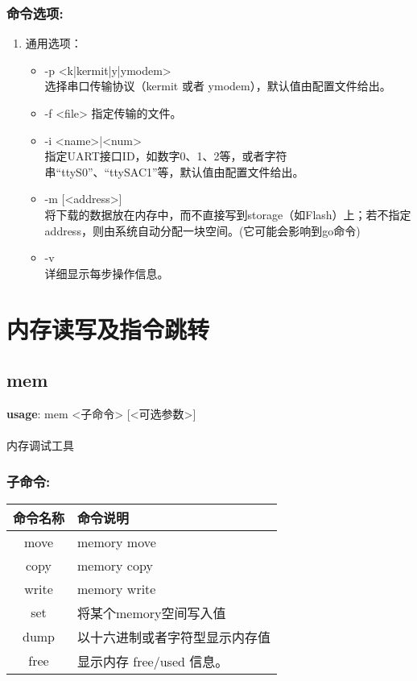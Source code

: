 \subsubsection{命令选项:}
\begin{enumerate}
	\item 通用选项：
	\begin{itemize}
		\item -p <k|kermit|y|ymodem> \\
		选择串口传输协议（kermit 或者 ymodem），默认值由配置文件给出。
		\item -f <file>
		指定传输的文件。
		\item -i <name>|<num> \\
		指定UART接口ID，如数字0、1、2等，或者字符串``ttyS0''、``ttySAC1''等，默认值由配置文件给出。
		\item -m [<address>] \\
		将下载的数据放在内存中，而不直接写到storage（如Flash）上；若不指定address，则由系统自动分配一块空间。(它可能会影响到go命令)
		\item -v \\
		详细显示每步操作信息。
	\end{itemize}
\end{enumerate}

\section{内存读写及指令跳转}

\subsection{mem}
\textbf{usage}: mem <子命令> [<可选参数>] \\
\\ 内存调试工具

\subsubsection{子命令:}
\begin{table}[H]
\begin{tabular}{|c|l|} \hline
命令名称 & 命令说明 \\ \hline
move & memory move \\ \hline
copy & memory copy \\ \hline
write & memory write \\ \hline
set & 将某个memory空间写入值 \\ \hline
dump & 以十六进制或者字符型显示内存值 \\ \hline
free & 显示内存 free/used 信息。\\ \hline
\end{tabular}
\end{table}

